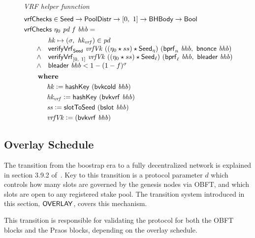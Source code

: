 \begin{figure}
  \emph{VRF helper funnction}
  \begin{align*}
      & \mathsf{vrfChecks} \in \mathsf{Seed} \to \mathsf{PoolDistr} \to [0,~1] \to \mathsf{BHBody} \to \mathsf{Bool} \\
      & \mathsf{vrfChecks}~\eta_0~\mathit{pd}~\mathit{f}~\mathit{bhb} = \\
      & \begin{array}{cl}
        ~~~~ & \mathit{hk}\mapsto (\sigma,~\mathit{hk_{vrf}})\in\mathit{pd} \\
        ~~~~ \land &
             \mathsf{verifyVrf}_{\mathsf{Seed}} ~ \mathit{vrfVk} ~ ((\eta_0\star ss)\star\mathsf{Seed}_\eta) ~(\mathsf{bprf}_{n}~\mathit{bhb},~\mathsf{bnonce}~\mathit{bhb}) \\
        ~~~~ \land &
             \mathsf{verifyVrf}_{[0,~1]} ~ \mathit{vrfVk} ~ ((\eta_0\star ss)\star\mathsf{Seed}_\ell) ~(\mathsf{bprf}_{\ell}~\mathit{bhb},~\mathsf{bleader}~\mathit{bhb}) \\
        ~~~~ \land &
             \mathsf{bleader}~\mathit{bhb} < 1 - (1 - f)^{\sigma} \\
      \end{array} \\
      & ~~~~~ ~ \mathbf{where}~ ~  \\
      & ~~~~~~~~~~\mathit{hk} \mathrel{\mathop:}= \mathsf{hashKey}~ \mathit{(\mathsf{bvkcold}~\mathit{b}hb)} \\
      & ~~~~~~~~~~\mathit{hk_{vrf}} \mathrel{\mathop:}= \mathsf{hashKey}~ \mathit{(\mathsf{bvkvrf}~\mathit{bhb})} \\
      & ~~~~~~~~~~\mathit{ss} \mathrel{\mathop:}= \mathsf{slotToSeed}~ \mathit{(\mathsf{bslot}~\mathit{bhb})} \\
      & ~~~~~~~~~~\mathit{vrfVk} \mathrel{\mathop:}= (\mathsf{bvkvrf}~\mathit{bhb}) \\
  \end{align*}
  \label{fig:vrf-checks}
\end{figure}

\clearpage

\subsection{Overlay Schedule}
\label{sec:overlay-schedule}

The transition from the boostrap era to a fully decentralized network is explained in
section 3.9.2 of~\cite{delegation_design}.
Key to this transition is a protocol parameter $d$ which controls how many slots are governed by
the genesis nodes via OBFT, and which slots are open to any registered stake pool.
The transition system introduced in this section, $\mathsf{OVERLAY}$, covers this mechanism.

This transition is responsible for validating the protocol for both the OBFT blocks
and the Praos blocks, depending on the overlay schedule.

